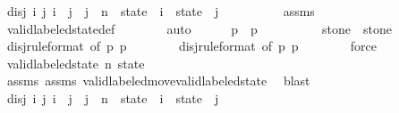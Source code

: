 \begin{isabellebody}
\ disj{\isacharcolon}\ {\isachardoublequoteopen}{\isasymforall}i\ j{\isachardot}\ i\ {\isacharless}\ j\ {\isasymand}\ j\ {\isasymle}\ n\ {\isasymlongrightarrow}\ state\ {\isacharbang}\ i\ {\isasyminter}\ state\ {\isacharbang}\ j\ {\isacharequal}\ {\isacharbraceleft}{\isacharbraceright}{\isachardoublequoteclose}\isanewline
\ \ \ \ \ \ \isamarkupfalse%
\ assms{\isacharparenleft}{}{\isacharparenright}\isanewline
\ \ \ \ \ \ \isamarkupfalse%
\ valid{\isacharunderscore}labeled{\isacharunderscore}state{\isacharunderscore}def\isanewline
\ \ \ \ \ \ \isamarkupfalse%
\ auto\isanewline
\isanewline
\ \ \ \ \isamarkupfalse%
\ {\isachardoublequoteopen}p{}\ {\isacharequal}\ p{}{\isacharprime}{\isachardoublequoteclose}\isanewline
\ \ \ \ \ \ \isamarkupfalse%
\ {\isacharasterisk}{\isacharparenleft}{}{\isacharparenright}\ {\isacharasterisk}{\isacharasterisk}{\isacharparenleft}{}{\isacharparenright}\ {\isacharbackquoteopen}stone\ {\isacharequal}\ stone{\isacharprime}{\isacharbackquoteclose}\ {\isacharasterisk}{\isacharparenleft}{}{\isacharminus}{}{\isacharparenright}\ {\isacharasterisk}{\isacharasterisk}{\isacharparenleft}{}{\isacharminus}{}{\isacharparenright}\isanewline
\ \ \ \ \ \ \isamarkupfalse%
\ disj{\isacharbrackleft}rule{\isacharunderscore}format{\isacharcomma}\ of\ p{}\ p{}{\isacharprime}{\isacharbrackright}\isanewline
\ \ \ \ \ \ \isamarkupfalse%
\ disj{\isacharbrackleft}rule{\isacharunderscore}format{\isacharcomma}\ of\ p{}{\isacharprime}\ p{}{\isacharbrackright}\isanewline
\ \ \ \ \ \ \isamarkupfalse%
\ force\isanewline
\isanewline
\ \ \ \ \isamarkupfalse%
\ {\isachardoublequoteopen}valid{\isacharunderscore}labeled{\isacharunderscore}state\ n\ state{\isacharprime}{\isachardoublequoteclose}\isanewline
\ \ \ \ \ \ \isamarkupfalse%
\ assms{\isacharparenleft}{}{\isacharparenright}\ assms{\isacharparenleft}{}{\isacharparenright}\ valid{\isacharunderscore}labeled{\isacharunderscore}move{\isacharunderscore}valid{\isacharunderscore}labeled{\isacharunderscore}state\ \isamarkupfalse%
\ blast\isanewline
\ \ \ \ \isamarkupfalse%
\ \isamarkupfalse%
\ disj{\isacharprime}{\isacharcolon}\ {\isachardoublequoteopen}{\isasymforall}i\ j{\isachardot}\ i\ {\isacharless}\ j\ {\isasymand}\ j\ {\isasymle}\ n\ {\isasymlongrightarrow}\ state{\isacharprime}\ {\isacharbang}\ i\ {\isasyminter}\ state{\isacharprime}\ {\isacharbang}\ j\ {\isacharequal}\ {\isacharbraceleft}{\isacharbraceright}{\isachardoublequoteclose}\isanewline

\end{isabellebody}
